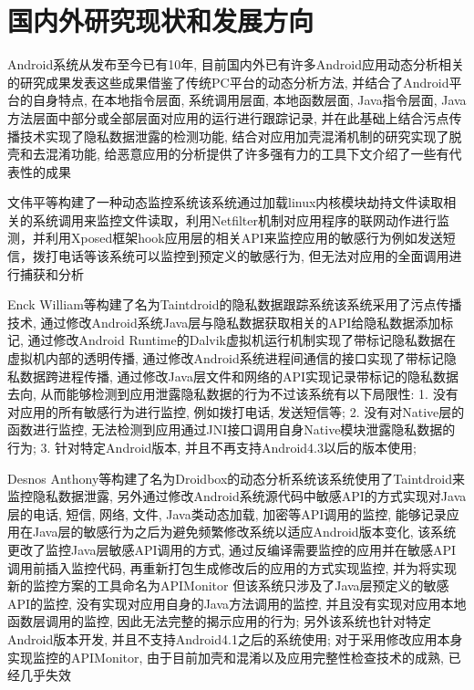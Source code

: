 \section{国内外研究现状和发展方向}
Android系统从发布至今已有10年, 目前国内外已有许多Android应用动态分析相关的研究成果发表\juhao 这些成果借鉴了传统PC平台的动态分析方法, 并结合了Android平台的自身特点, 在本地指令层面, 系统调用层面, 本地函数层面, Java指令层面, Java方法层面中部分或全部层面对应用的运行进行跟踪记录, 并在此基础上结合污点传播技术实现了隐私数据泄露的检测功能, 结合对应用加壳混淆机制的研究实现了脱壳和去混淆功能, 给恶意应用的分析提供了许多强有力的工具\juhao 下文介绍了一些有代表性的成果\juhao

文伟平等构建了一种动态监控系统\juhao 该系统通过加载linux内核模块劫持文件读取相关的系统调用来监控文件读取，利用Netfilter机制对应用程序的联网动作进行监测，并利用Xposed框架hook应用层的相关API来监控应用的敏感行为例如发送短信，拨打电话等\juhao 该系统可以监控到预定义的敏感行为, 但无法对应用的全面调用进行捕获和分析\juhao 

Enck William等构建了名为Taintdroid的隐私数据跟踪系统\juhao 该系统采用了污点传播技术, 通过修改Android系统Java层与隐私数据获取相关的API给隐私数据添加标记, 通过修改Android Runtime的Dalvik虚拟机运行机制实现了带标记隐私数据在虚拟机内部的透明传播, 通过修改Android系统进程间通信的接口实现了带标记隐私数据跨进程传播, 通过修改Java层文件和网络的API实现记录带标记的隐私数据去向, 从而能够检测到应用泄露隐私数据的行为\juhao 不过该系统有以下局限性: 
1. 没有对应用的所有敏感行为进行监控, 例如拨打电话, 发送短信等;
2. 没有对Native层的函数进行监控, 无法检测到应用通过JNI接口调用自身Native模块泄露隐私数据的行为;
3. 针对特定Android版本, 并且不再支持Android4.3以后的版本使用;
 
Desnos Anthony等构建了名为Droidbox的动态分析系统\juhao 该系统使用了Taintdroid来监控隐私数据泄露, 另外通过修改Android系统源代码中敏感API的方式实现对Java层的电话, 短信, 网络, 文件, Java类动态加载, 加密等API调用的监控, 能够记录应用在Java层的敏感行为\juhao 之后为避免频繁修改系统以适应Android版本变化, 该系统更改了监控Java层敏感API调用的方式, 通过反编译需要监控的应用并在敏感API调用前插入监控代码, 再重新打包生成修改后的应用的方式实现监控, 并为将实现新的监控方案的工具命名为APIMonitor\juhao 
但该系统只涉及了Java层预定义的敏感API的监控, 没有实现对应用自身的Java方法调用的监控, 并且没有实现对应用本地函数层调用的监控, 因此无法完整的揭示应用的行为; 另外该系统也针对特定Android版本开发, 并且不支持Android4.1之后的系统使用; 对于采用修改应用本身实现监控的APIMonitor, 由于目前加壳和混淆以及应用完整性检查技术的成熟, 已经几乎失效\juhao

